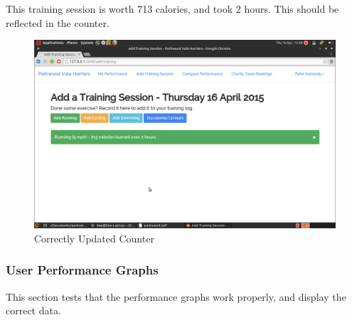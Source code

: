 \documentclass{article}[12pt,a4paper]
\begin{document}
This training session is worth 713 calories, and took 2 hours. This should be reflected in the counter.

\begin{figure}[h!]
    \includegraphics[scale=0.33]{images/testing/add_activity/counter_update}
    \caption{Correctly Updated Counter}
\end{figure}

\subsubsection{User Performance Graphs}
This section tests that the performance graphs work properly, and display the correct data.\\
\end{document}

